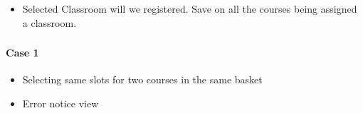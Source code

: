 \documentclass[letterpaper,10pt,english]{sphinxmanual}
\begin{document}
\begin{itemize}
\item {} 
Selected Classroom will we registered. Save on all the courses being assigned a classroom.

\end{itemize}



\subsection{}
\label{\detokenize{user_manual:id7}}

\subsubsection{Case 1}
\label{\detokenize{user_manual:id8}}\begin{itemize}
\item {} 
Selecting same slots for two courses in the same basket

\end{itemize}

\begin{itemize}
\item {} 
Error notice view

\end{itemize}



\chapter{}
\label{\detokenize{developer:developer-manual}}\label{\detokenize{developer::doc}}
\end{document}
